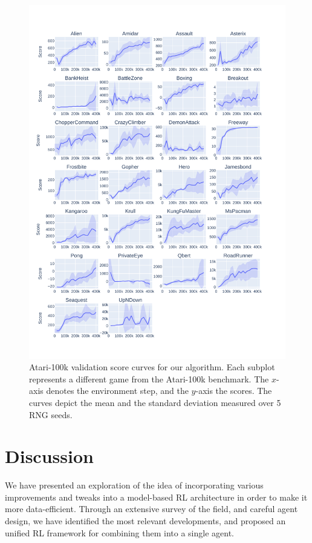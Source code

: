 \documentclass[en]{pracamgr}
\newcommand{\figurewidth}{\linewidth}
\newcommand{\figureheight}{0.8\paperheight}
\begin{document}
\begin{figure}
  \centering
  \includegraphics[width=\figurewidth,height=\figureheight,keepaspectratio]{assets/atari_100k.curves.pdf}
  \caption{Atari-100k validation score curves for our algorithm. Each subplot represents a different game from the Atari-100k benchmark. The $x$-axis denotes the environment step, and the $y$-axis the scores. The curves depict the mean and the standard deviation measured over 5 RNG seeds.}
  \label{fig:atari_100k_curves}
\end{figure}

\chapter{Discussion}

We have presented an exploration of the idea of incorporating various improvements and tweaks into a model-based RL architecture in order to make it more data-efficient. Through an extensive survey of the field, and careful agent design, we have identified the most relevant developments, and proposed an unified RL framework for combining them into a single agent.
\end{document}
